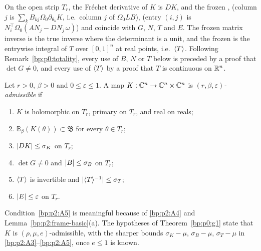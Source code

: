 \begin{remark}\label{bp:p2:frozen-agreement}
On the open strip $T_r$, the Fr\'echet derivative of $K$ is $DK$, and the frozen ,
 (column $j$ is $\sum_kB_{kj}\Omega_0\partial_{\theta_k}K$, i.e.\ column $j$ of
$\Omega_0LB$),  (entry $(i,j)$ is $N_i^\top\Omega_0(AN_j-DN_j\,\omega)$) and
 coincide with $G$, $N$, $T$ and $E$. The frozen matrix inverse is the true inverse
where the determinant is a unit, and the frozen  is the entrywise integral of $T$
over $[0,1]^n$ at real points, i.e.\ $\langle T\rangle$. Following Remark~\ref{bp:p0:totality}, every use of $B$,
$N$ or $T$ below is preceded by a proof that $\det G\ne0$, and every use of $\langle T\rangle$ by a proof that $T$
is continuous on $\mathbb{R}^n$.
\end{remark}

\begin{definition}\label{bp:p2:admissible}
Let $r>0$, $\beta>0$ and $0\le\varepsilon\le1$. A map $K:\mathbb{C}^n\to\mathbb{C}^n\times\mathbb{C}^n$ is
\emph{$(r,\beta,\varepsilon)$-admissible} if
\begin{enumerate}[label=(A\arabic*)]
\item\label{bp:p2:A1} $K$ is holomorphic on $T_r$, primary on $T_r$, and real on reals;
\item\label{bp:p2:A2} $\mathbb B_\beta(K(\theta))\subset\mathfrak B$ for every $\theta\in T_r$;
\item\label{bp:p2:A3} $\lvert DK\rvert\le\sigma_K$ on $T_r$;
\item\label{bp:p2:A4} $\det G\ne0$ and $\lvert B\rvert\le\sigma_B$ on $T_r$;
\item\label{bp:p2:A5} $\langle T\rangle$ is invertible and $\lvert \langle T\rangle^{-1}\rvert\le\sigma_T$;
\item\label{bp:p2:A6} $\lvert E\rvert\le\varepsilon$ on $T_r$.
\end{enumerate}
\end{definition}

Condition~\ref{bp:p2:A5} is meaningful because of \ref{bp:p2:A4} and
Lemma~\ref{bp:p2:frame-basic}(a). The hypotheses of Theorem~\ref{bp:p0:g1} state that $K$ is
$(\rho,\mu,e)$-admissible, with the sharper bounds $\sigma_K-\mu$, $\sigma_B-\mu$, $\sigma_T-\mu$ in
\ref{bp:p2:A3}--\ref{bp:p2:A5}, once $e\le1$ is known.

